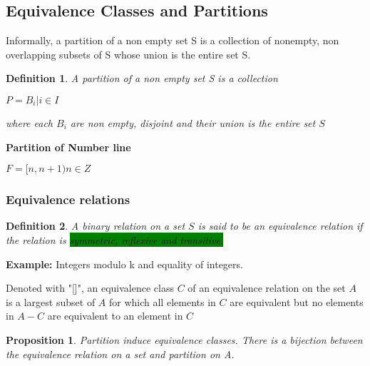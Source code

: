 \documentclass[12pt]{article}
\newcommand{\mybox}[2][black]{\colorbox{#1}{#2}}
\newtheorem{definition}{Definition}
\newtheorem{proposition}{Proposition}
\begin{document}
\subsection{Equivalence Classes and Partitions}

Informally, a partition of a non empty set S is a collection of nonempty, non overlapping subsets of S whose union is the entire set S.


\begin{definition}
 A partition of a non empty set S is a collection 

\(P = {B_i | i \in I}\)

where each $B_i$ are non empty, disjoint and their union is the entire set $S$
\end{definition}
\textbf{Partition of Number line} 

\(F = [n,n+1) n \in Z\)
 \subsubsection{Equivalence relations}

\begin{definition}
A binary relation on a set $S$ is said to be an equivalence relation if the relation is \mybox[green]{symmetric, reflexive and transitive.}

\end{definition}

\textbf{Example:} Integers modulo k and equality of integers.

Denoted with "[]", an equivalence class $C$ of an equivalence relation on the set $A$ is a largest subset of $A$ for which all elements in $C$ are equivalent but no elements in $A-C$ are equivalent to an element in $C$


\begin{proposition}
Partition induce equivalence classes. There is a bijection between the equivalence relation on a set and partition on A.
\end{proposition}
\end{document}

